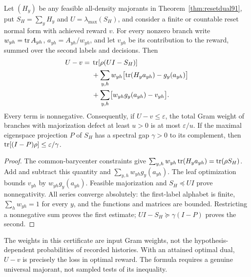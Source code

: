 \begin{corollary}\label{cor:contactdefect91}
Let $(H_y)$ be any feasible all-density majorants in
Theorem~\ref{thm:resetdual91}, put $S_H=\sum_yH_y$ and
$U=\lambda_{\max}(S_H)$, and consider a finite or countable reset
normal form with achieved reward $v$.  For every nonzero branch write
$w_{yh}=\operatorname{tr} A_{yh}$, $a_{yh}=A_{yh}/w_{yh}$, and let $v_{yh}$
be its contribution to the reward, summed over the second labels and
decisions.  Then
\begin{equation}\label{eq:contactdefect91}
\begin{split}
 U-v={}&\operatorname{tr}[\rho(UI-S_H)]\\
 &+\sum_{y,h}w_{yh}\bigl[\operatorname{tr}(H_ya_{yh})-g_y(a_{yh})\bigr]\\
 &+\sum_{y,h}\bigl[w_{yh}g_y(a_{yh})-v_{yh}\bigr].
\end{split}
\end{equation}
Every term is nonnegative.  Consequently, if $U-v\le\varepsilon$,
the total Gram weight of branches with majorization defect at least
$u>0$ is at most $\varepsilon/u$.  If the maximal eigenspace projection
$P$ of $S_H$ has a spectral gap $\gamma>0$ to its complement, then
$\operatorname{tr}[(I-P)\rho]\le\varepsilon/\gamma$.
\end{corollary}
\begin{proof}
The common-barycenter constraints give
$\sum_{y,h}w_{yh}\operatorname{tr}(H_ya_{yh})=\operatorname{tr}(\rho S_H)$.
Add and subtract this quantity and $\sum_{y,h}w_{yh}g_y(a_{yh})$.
The leaf optimization bounds $v_{yh}$ by $w_{yh}g_y(a_{yh})$.
Feasible majorization and $S_H\preceq UI$ prove nonnegativity.
All series converge absolutely: the first-label alphabet is finite,
$\sum_hw_{yh}=1$ for every $y$, and the functions and matrices are
bounded.  Restricting a nonnegative sum proves the first estimate;
$UI-S_H\succeq\gamma(I-P)$ proves the second.
\end{proof}
The weights in this certificate are input Gram weights, not the
hypothesis-dependent probabilities of recorded histories.  With an
attained optimal dual, $U-v$ is precisely the loss in optimal reward.
The formula requires a genuine universal majorant, not sampled tests
of its inequality.

